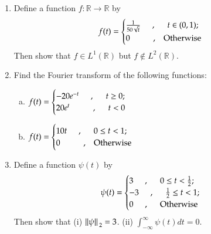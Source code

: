 \documentclass[12pt, a4paper]{article} %
\begin{document}
\begin{enumerate}
    \item Define a function $\displaystyle f:\mathbb{R}\to\mathbb{R}$ by \[f(t) = \begin{cases}
        \frac{1}{50\sqrt{t}}\hspace*{0.5cm},\hspace*{0.5cm} t\in (0,1) ; & \\
        0\hspace*{1cm},\hspace*{0.3cm} \mbox{Otherwise}
    \end{cases}\]
    Then show that $\displaystyle f\in L^1(\mathbb{R})$ but $\displaystyle f\notin L^2(\mathbb{R})$.

    \item Find the Fourier transform of the following functions:
    \begin{enumerate}[(a)]
        \item $\displaystyle f(t) = \begin{cases}
            -20e^{-t} \hspace*{0.5cm},\hspace*{0.5cm} t\geq 0 ; &\\
            20e^t \hspace*{1cm},\hspace*{0.5cm} t < 0
        \end{cases}$
        \item $\displaystyle f(t) = \begin{cases}
            10t \hspace*{0.5cm},\hspace*{0.5cm} 0\leq t < 1 ; &
            \\
            0\hspace*{1cm},\hspace*{0.3cm} \mbox{Otherwise}
        \end{cases}$    
    \end{enumerate}

    \item Define a function $\displaystyle \psi(t)$ by 
    \[\psi(t) = \begin{cases}
        3 \hspace*{0.5cm}, \hspace*{0.5cm} 0\leq t < \frac{1}{2}; &\\
        -3 \hspace*{0.5cm}, \hspace*{0.5cm} \frac{1}{2}\leq t < 1; &\\
        0 \hspace*{0.5cm}, \hspace*{0.5cm} \mbox{Otherwise}
    \end{cases}\]
    Then show that (i) $\displaystyle \norm*{\psi}_2 = 3$. \hspace*{0.4cm}(ii) $\displaystyle \int_{-\infty}^{\infty} \psi(t)dt = 0$. 


\end{enumerate}
\end{document}
